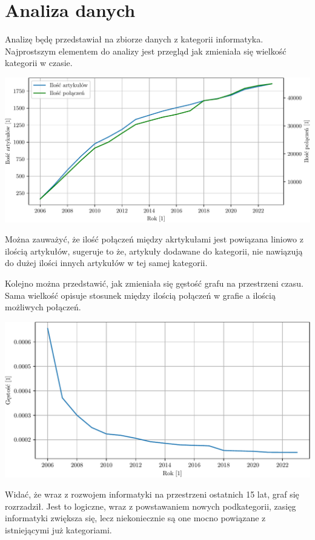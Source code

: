 \documentclass[a4paper, 12pt]{article}
\begin{document}
\section{Analiza danych}
Analizę będę przedstawiał na zbiorze danych z kategorii informatyka. Najprostszym elementem do analizy jest przegląd jak zmieniała się wielkość kategorii w czasie.
\begin{center}
    \includegraphics[width=0.90\linewidth]{figures/size.pdf}
\end{center}
Można zauważyć, że ilość połączeń między akrtykułami jest powiązana liniowo z ilością artykułów, sugeruje to że, artykuły dodawane do kategorii, nie nawiązują do dużej ilości innych artykułów w tej samej kategorii.

Kolejno można przedstawić, jak zmieniała się gęstość grafu na przestrzeni czasu. Sama wielkość opisuje stosunek między ilością połączeń w grafie a ilością możliwych połączeń.
\begin{center}
    \includegraphics[width=0.90\linewidth]{figures/density.pdf}
\end{center}
Widać, że wraz z rozwojem informatyki na przestrzeni ostatnich 15 lat, graf się rozrzadził. Jest to logiczne, wraz z powstawaniem nowych podkategorii, zasięg informatyki zwiększa się, lecz niekoniecznie są one mocno powiązane z istniejącymi już kategoriami.
\end{document}
